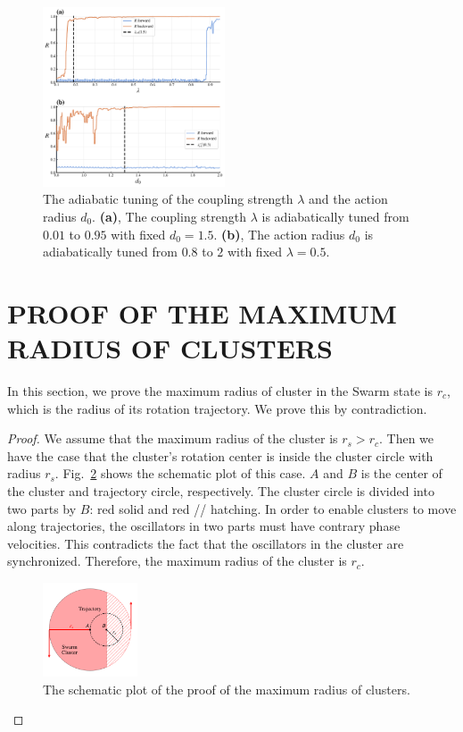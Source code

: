 \documentclass[%
 aip,
 amsmath,amssymb,
 reprint,%
]{revtex4-1}
\begin{document}
\begin{figure}
    \includegraphics[width=0.48\textwidth]{./figs/aditionalTuning.pdf}
    \caption{
        \label{fig:adiabaticTuning} The adiabatic tuning of the coupling strength $\lambda$ and the action radius $d_0$.
        \textbf{(a)}, The coupling strength $\lambda$ is adiabatically tuned from $0.01$ to $0.95$ with fixed $d_0=1.5$.
        \textbf{(b)}, The action radius $d_0$ is adiabatically tuned from $0.8$ to $2$ with fixed $\lambda=0.5$.
    }
\end{figure}

\section{\label{sec:maxRadius} PROOF OF THE MAXIMUM RADIUS OF CLUSTERS}

In this section, we prove the maximum radius of cluster in the Swarm state is $r_c$, which is the radius of its rotation trajectory. We prove this by contradiction.

\begin{proof}
    We assume that the maximum radius of the cluster is $r_s>r_c$. Then we have the case that the cluster's rotation center is inside the cluster circle with radius $r_s$. 
    Fig.~\ref{fig:rsProofEps} shows the schematic plot of this case. $A$ and $B$ is the center of the cluster and trajectory circle, respectively. The cluster circle is divided into two parts by $B$: red solid and red // hatching. In order to enable clusters to move along trajectories, the oscillators in two parts must have contrary phase velocities. This contradicts the fact that the oscillators in the cluster are synchronized. Therefore, the maximum radius of the cluster is $r_c$.

    \begin{figure}
        \includegraphics[width=0.25\textwidth]{./figs/rsProofEps.pdf}
        \caption{
            \label{fig:rsProofEps} The schematic plot of the proof of the maximum radius of clusters.
        }
    \end{figure}

\end{proof}
\end{document}
